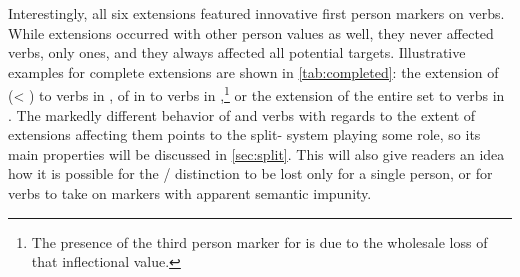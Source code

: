 Interestingly, all six extensions featured innovative first person markers on  verbs.
While extensions occurred with other person values as well, they never affected  verbs, only  ones, and they always affected all potential targets.
Illustrative examples for complete extensions are shown in \cref{tab:completed}: the extension of   (< ) to  verbs in \apalai {}, of   in to  verbs in \panare {},\footnote{The presence of the third person marker  for  is due to the wholesale loss of that inflectional value.} or the extension of the entire  set to  verbs in \waimiri {}. %
The markedly different behavior of  and  verbs with regards to the extent of extensions affecting them points to the split- system playing some role, so its main properties will be discussed in \cref{sec:split}.
This will also give readers an idea how it is possible for the / distinction to be lost only for a single person, or for  verbs to take on  markers with apparent semantic impunity.



